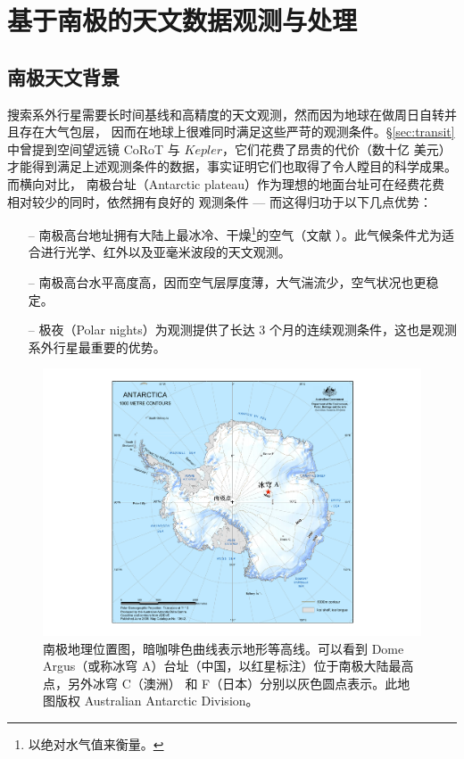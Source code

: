 \chapter{基于南极的天文数据观测与处理} \label{chapter:obs_red}

\section{南极天文背景} \label{sec:antarticabg}

搜索系外行星需要长时间基线和高精度的天文观测，然而因为地球在做周日自转并且存在大气包层，
因而在地球上很难同时满足这些严苛的观测条件。\S \ref{sec:transit} 中曾提到空间望远镜 CoRoT
\cite{Bargeetal2008CoRoT} 与 $Kepler$\cite{Boruckietal2010}，它们花费了昂贵的代价（数十亿
美元）才能得到满足上述观测条件的数据，事实证明它们也取得了令人瞠目的科学成果。而横向对比，
南极台址（Antarctic plateau）作为理想的地面台址可在经费花费相对较少的同时，依然拥有良好的
观测条件 --- 而这得归功于以下几点优势：

\begin{enumerate}[leftmargin=1\parindent] 
\item[--] 南极高台地址拥有大陆上最冰冷、干燥\footnote{以绝对水气值来衡量。}的空气（文献 ）。此气候条件尤为适合进行光学、红外以及亚毫米波段的天文观测\cite{Lawrence2004}。
\item[--] 南极高台水平高度高，因而空气层厚度薄，大气湍流少，空气状况也更稳定\cite{Bonner2010}。
\item[--] 极夜（Polar nights）为观测提供了长达 3 个月的连续观测条件，这也是观测系外行星最重要的优势\cite{Rauer2008}。
\end{enumerate}

\begin{figure}[t]
\centering
\includegraphics[width=1.0\textwidth]{figures/chapter2/f1_DomeA.pdf}
\caption{南极地理位置图，暗咖啡色曲线表示地形等高线。可以看到 Dome Argus（或称冰穹 A）台址（中国，以红星标注）位于南极大陆最高点，另外冰穹 C（澳洲） 和 F（日本）分别以灰色圆点表示。此地图版权 Australian Antarctic Division。}
\label{fig:domeasite}
\end{figure}

